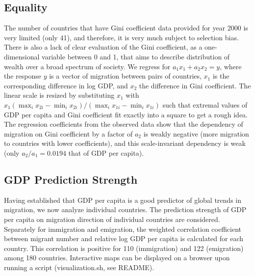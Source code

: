\documentclass{acm_proc_article-sp}
\begin{document}
\subsection{Equality}
The number of countries that have Gini coefficient data provided for year 2000 is very limited (only 41), and therefore, it is very much subject to selection bias. There is also a lack of clear evaluation of the Gini coefficient, as a one-dimensional variable between 0 and 1, that aims to describe distribution of wealth over a broad spectrum of society. We regress for $a_1x_1 + a_2x_2 = y$, where the response $y$ is a vector of migration between pairs of countries, $x_1$ is the corresponding difference in log GDP, and $x_2$ the difference in Gini coefficient. The linear scale is resized by substituting $x_1$ with $x_1 (\max_i x_{2i} - \min_i x_{2i})/(\max_i x_{1i} - \min_i x_{1i}) $ such that extremal values of GDP per capita and Gini coefficient fit exactly into a square to get a rough idea. The regression coefficients from the observed data show that the dependency of migration on Gini coefficient by a factor of $a_2$ is weakly negative (more migration to countries with lower coefficients), and this scale-invariant dependency is weak (only $a_2/a_1 = 0.0194$ that of GDP per capita).

\subsection{GDP Prediction Strength}
Having established that GDP per capita is a good predictor of global trends in migration, we now analyze individual countries. The prediction strength of GDP per capita on migration direction of individual countries are considered. Separately for immigration and emigration, the weighted correlation coefficient between migrant number and relative log GDP per capita is calculated for each country. This correlation is positive for 110 (immigration) and 122 (emigration) among 180 countries. Interactive maps can be displayed on a browser upon running a script (visualization.sh, see README).
\end{document}
